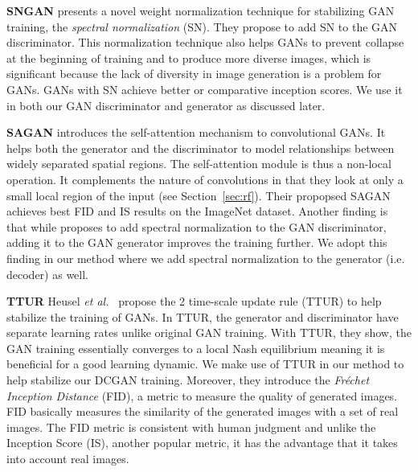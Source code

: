 \documentclass[12pt,a4paper]{article}
\begin{document}
\par \textbf{SNGAN} \cite{SNGAN} presents a novel weight normalization technique for stabilizing GAN training, the \textit{spectral normalization} (SN). They propose to add SN to the GAN discriminator. This normalization technique also helps GANs to prevent collapse at the beginning of training and to produce more diverse images, which is significant because the lack of diversity in image generation is a problem for GANs. GANs with SN achieve better or comparative inception scores. We use it in both our GAN discriminator and generator as discussed later.

\par \textbf{SAGAN} \cite{SAGAN} introduces the self-attention mechanism to convolutional GANs. It helps both the generator and the discriminator to model relationships between widely separated spatial regions. The self-attention module is thus a non-local operation. It complements the nature of convolutions in that they look at only a small local region of the input (see Section~\ref{sec:rf}). Their propopsed SAGAN achieves best FID and IS results on the ImageNet dataset. Another finding is that while \cite{SNGAN} proposes to add spectral normalization to the GAN discriminator, adding it to the GAN generator improves the training further. We adopt this finding in our method where we add spectral normalization to the generator (i.e. decoder) as well. 

\par \textbf{TTUR} Heusel \textit{et al.}~\cite{TTUR} propose the 2 time-scale
update rule (TTUR) to help stabilize the training of GANs. In TTUR, the generator and discriminator have separate learning rates unlike original GAN training. With TTUR, they show, the GAN training essentially converges to a local Nash equilibrium meaning it is beneficial for a good learning dynamic. We make use of TTUR in our method to help stabilize our DCGAN training. Moreover, they introduce the \textit{Fréchet Inception Distance} (FID), a metric to measure the quality of generated images. FID basically measures the similarity of the generated images with a set of real images. The FID metric is consistent with human judgment and unlike the Inception Score (IS), another popular metric, it has the advantage that it takes into account real images.
\end{document}
